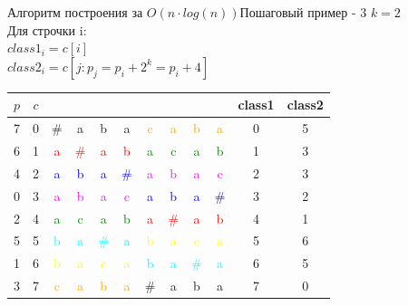 \documentclass[10pt]{beamer}
\begin{document}
\begin{frame}[fragile]{Алгоритм построения за $O(n \cdot log(n))$}{Пошаговый пример - 3}
$k = 2$\\
Для строчки i: \\
$class1_i = c[i]$ \\
$class2_i = c[j: p_j=p_i+2^k=p_i+4]$ \\
\begin{center}
\begin{tabular}{ c|c|cccccccc|c|c } 
 $p$ & $c$ & & & & & & & & & class1 & class2 \\ 
  \hline
 7 & 0 & \# & a & b & a & \textcolor{orange}{c} & \textcolor{orange}{a} & \textcolor{orange}{b} & \textcolor{orange}{a} & 0 & 5 \\ 
  \hline
 6 & 1 & \textcolor{red}{a} & \textcolor{red}{\#} & \textcolor{red}{a} & \textcolor{red}{b} & \textcolor{green}{a} & \textcolor{green}{c} & \textcolor{green}{a} & \textcolor{green}{b} & 1 & 3 \\ 
  \hline
 4 & 2 & \textcolor{blue}{a} & \textcolor{blue}{b} & \textcolor{blue}{a} & \textcolor{blue}{\#} & \textcolor{magenta}{a} & \textcolor{magenta}{b} & \textcolor{magenta}{a} & \textcolor{magenta}{c} & 2 & 3 \\ 
 \hline
 0 & 3 & \textcolor{magenta}{a} & \textcolor{magenta}{b} & \textcolor{magenta}{a} & \textcolor{magenta}{c} & \textcolor{blue}{a} & \textcolor{blue}{b} & \textcolor{blue}{a} & \textcolor{blue}{\#} & 3 & 2 \\ 
 \hline
 2 & 4 & \textcolor{green}{a} & \textcolor{green}{c} & \textcolor{green}{a} & \textcolor{green}{b} & \textcolor{red}{a} & \textcolor{red}{\#} & \textcolor{red}{a} & \textcolor{red}{b} & 4 & 1 \\ 
  \hline
 5 & 5 & \textcolor{cyan}{b} & \textcolor{cyan}{a} & \textcolor{cyan}{\#} & \textcolor{cyan}{a} & \textcolor{yellow}{b} & \textcolor{yellow}{a} & \textcolor{yellow}{c} & \textcolor{yellow}{a} & 5 & 6 \\ 
 \hline
 1 & 6 & \textcolor{yellow}{b} & \textcolor{yellow}{a} & \textcolor{yellow}{c} & \textcolor{yellow}{a} & \textcolor{cyan}{b} & \textcolor{cyan}{a} & \textcolor{cyan}{\#} & \textcolor{cyan}{a} & 6 & 5 \\ 
 \hline
 3 & 7 & \textcolor{orange}{c} & \textcolor{orange}{a} & \textcolor{orange}{b} & \textcolor{orange}{a} & \# & a & b & a & 7 & 0 \\ 
\end{tabular}
\end{center}
\end{frame}
\end{document}
